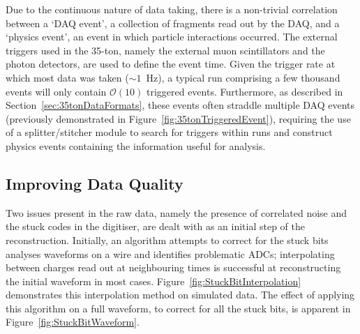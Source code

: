Due to the continuous nature of data taking, there is a non-trivial correlation between a `DAQ event', a collection of fragments read out by the DAQ, and a `physics event', an event in which particle interactions occurred.  The external triggers used in the 35-ton, namely the external muon scintillators and the photon detectors, are used to define the event time.  Given the trigger rate at which most data was taken ($\sim1$~Hz), a typical run comprising a few thousand events will only contain $\mathcal{O}(10)$ triggered events.  Furthermore, as described in Section~\ref{sec:35tonDataFormats}, these events often straddle multiple DAQ events (previously demonstrated in Figure~\ref{fig:35tonTriggeredEvent}), requiring the use of a splitter/stitcher module to search for triggers within runs and construct physics events containing the information useful for analysis.

\subsection{Improving Data Quality}\label{sec:ImprovingDataQuality}

Two issues present in the raw data, namely the presence of correlated noise and the stuck codes in the digitiser, are dealt with as an initial step of the reconstruction.  Initially, an algorithm attempts to correct for the stuck bits analyses waveforms on a wire and identifies problematic ADCs; interpolating between charges read out at neighbouring times is successful at reconstructing the initial waveform in most cases.  Figure~\ref{fig:StuckBitInterpolation} demonstrates this interpolation method on simulated data.  The effect of applying this algorithm on a full waveform, to correct for all the stuck bits, is apparent in Figure~\ref{fig:StuckBitWaveform}.

